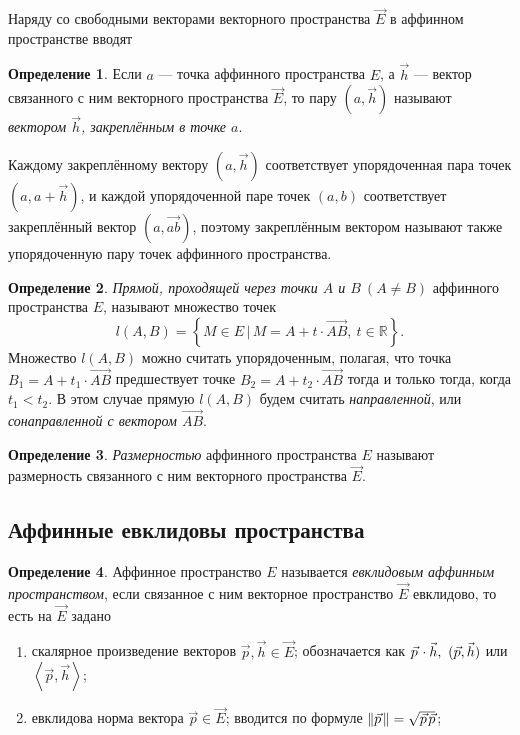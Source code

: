 \documentclass{article}
\theoremstyle{definition}
\newtheorem{definition}{Определение}[section]
\theoremstyle{plain}
\theoremstyle{remark}
\numberwithin{equation}{section}
\newcommand{\vv}[1]{\overrightarrow{#1}}
\newcommand{\wvec}[1]{\vec{#1}\mkern2mu\vphantom{#1}}
\newcommand{\norm}[1]{\left\lVert#1\right\rVert}
\newcommand{\dotprod}[2]{#1 \cdot #2}
\begin{document}
Наряду со свободными векторами векторного пространства $\vec{E}$ в аффинном
пространстве вводят
\begin{definition}
  Если $a$ --- точка аффинного пространства $E$, а $\vec{h}$ --- вектор
  связанного с ним векторного пространства $\vec{E}$, то пару $(a, \vec{h})$
  называют \textit{вектором $\vec{h}$, закреплённым в точке $a$}.

  Каждому закреплённому вектору $(a, \vec{h})$ соответствует упорядоченная пара
  точек $(a, a + \vec{h})$, и каждой упорядоченной паре точек $(a, b)$
  соответствует закреплённый вектор $(a, \vv{ab})$, поэтому закреплённым
  вектором называют также упорядоченную пару точек аффинного пространства.
\end{definition}

\begin{definition}
  \textit{Прямой, проходящей через точки $A$ и $B~(A \neq B)$} аффинного
  пространства $E$, называют множество точек
  \begin{equation*}
    l(A,B) = \left\{ M \in E \, | \, M = A + t \cdot \vv{AB},~t \in \mathbb{R}
    \right\}.
  \end{equation*}
  Множество $l(A,B)$ можно считать упорядоченным, полагая, что точка $B_1 = A +
  t_1 \cdot \vv{AB}$ предшествует точке $B_2 = A + t_2 \cdot \vv{AB}$ тогда и
  только тогда, когда $t_1 < t_2$. В этом случае прямую $l(A,B)$ будем считать
  \textit{направленной}, или \textit{сонаправленной с вектором $\vv{AB}$}.
\end{definition}

\begin{definition}
  \textit{Размерностью} аффинного пространства $E$ называют размерность
  связанного с ним векторного пространства $\vec{E}$.
\end{definition}

\subsection{Аффинные евклидовы пространства}

\begin{definition}
  Аффинное пространство $E$ называется \textit{евклидовым аффинным
  пространством}, если связанное с ним векторное пространство $\vec{E}$
  евклидово, то есть на $\vec{E}$ задано
  \begin{enumerate}
    \item скалярное произведение векторов $\vec{p}, \vec{h} \in \vec{E}$;
      обозначается как $\dotprod{\wvec{p}}{\vec{h}},~(\vec{p},\vec{h})$ или
      $\left\langle \vec{p},\vec{h} \right\rangle$;
    \item евклидова норма вектора $\vec{p} \in \vec{E}$; вводится по формуле
      $\norm{\wvec{p}} = \sqrt{\wvec{p}\vec{p}}$;
  \end{enumerate}
\end{definition}
\end{document}
